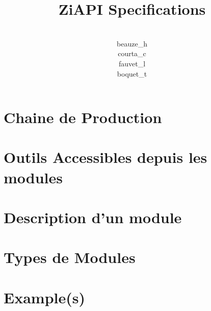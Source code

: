 \documentclass{report}
\title{ZiAPI Specifications}
\author{\\beauze\_h\\courta\_c\\fauvet\_l\\boquet\_t}
\begin{document}
  \maketitle
  \tableofcontents
  \chapter{Chaine de Production}
  
  \chapter{Outils Accessibles depuis les modules}
  
  \chapter{Description d'un module}
  
  \chapter{Types de Modules}
  
  \chapter{Example(s)}
  
    
\end{document}
